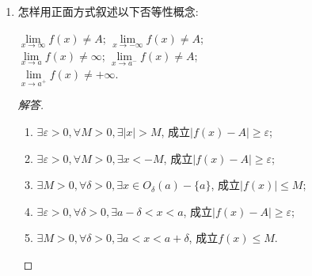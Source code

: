 \documentclass[a4paper,11pt,twoside]{ctexbook}
\begin{document}
\begin{enumerate}
	\item 怎样用正面方式叙述以下否等性概念:
	      \begin{tabenum}[(1)]
		      \tabenumitem $\lim\limits_{x\to\infty} f(x)\neq A$;
		      \tabenumitem $\lim\limits_{x\to-\infty} f(x)\neq A$;\\
		      \tabenumitem $\lim\limits_{x\to a} f(x)\neq\infty$;
		      \tabenumitem $\lim\limits_{x\to a^{-}} f(x)\neq A$;\\
		      \tabenumitem $\lim\limits_{x\to a^{+}} f(x)\neq +\infty$.
	      \end{tabenum}
	      \begin{proof}[解答]
		      \begin{enumerate}[(1)]
			      \item $\exists\varepsilon>0, \forall M>0, \exists |x|>M$, 成立$|f(x)-A|\geqslant\varepsilon$;
			      \item $\exists\varepsilon>0, \forall M>0, \exists x<-M$, 成立$|f(x)-A|\geqslant\varepsilon$;
			      \item $\exists M>0, \forall\delta>0, \exists x\in O_{\delta}(a)-\{a\}$, 成立$|f(x)|\leqslant M$;
			      \item $\exists\varepsilon>0, \forall\delta>0, \exists a-\delta<x<a$, 成立$|f(x)-A|\geqslant\varepsilon$;
			      \item $\exists M>0, \forall\delta>0, \exists a<x<a+\delta$, 成立$f(x)\leqslant M$. \qedhere
		      \end{enumerate}
	      \end{proof}
\end{enumerate}
\end{document}
